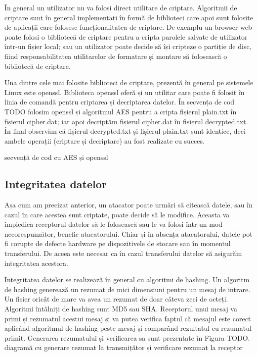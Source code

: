 În general un utilizator nu va folosi direct utilitare de criptare. Algoritmii de criptare sunt în general implementați în formă de biblioteci care apoi sunt folosite de aplicații care folosesc funcționalitatea de criptare. De exemplu un browser web poate folosi o bibliotecă de criptare pentru a cripta parolele salvate de utilizator într-un fișier local; sau un utilizator poate decide să își cripteze o partiție de disc, fiind responsabilitatea utilitarelor de formatare și montare să folosească o bibliotecă de criptare.

Una dintre cele mai folosite biblioteci de criptare, prezentă în general pe sistemele Linux este openssl. Biblioteca openssl oferă și un utilitar care poate fi folosit în linia de comandă pentru criptarea și decriptarea datelor. În secvența de cod TODO folosim openssl și algoritmul AES pentru a cripta fișierul plain.txt în fișierul cipher.dat; iar apoi decriptăm fișierul cipher.dat în fișierul decrypted.txt. În final observăm că fișierul decrypted.txt și fișierul plain.txt sunt identice, deci ambele operații (criptare și decriptare) au fost realizate cu succes.

secvență de cod cu AES și openssl

\subsection{Integritatea datelor}
\label{sec:sec:integrity}

Așa cum am precizat anterior, un atacator poate urmări să citească datele, sau în cazul în care acestea sunt criptate, poate decide să le modifice. Aceasta va împiedica receptorul datelor să le folosească sau le va folosi într-un mod necorespunzător, benefic atacatorului. Chiar și în absența atacatorului, datele pot fi corupte de defecte hardware pe dispozitivele de stocare sau în momentul transferului. De aceea este necesar ca în cazul transferului datelor să asigurăm integritatea acestora.

Integritatea datelor se realizează în general cu algoritmi de hashing. Un algoritm de hashing generează un rezumat de mici dimensiuni pentru un mesaj de intrare. Un fișier oricât de mare va avea un rezumat de doar câteva zeci de octeți. Algoritmi întâlniți de hashing sunt MD5 sau SHA. Receptorul unui mesaj va primi și rezumatul acestui mesaj și va putea verifica faptul că mesajul este corect aplicând algoritmul de hashing peste mesaj și comparând rezultatul cu rezumatul primit. Generarea rezumatului și verificarea sa sunt prezentate în Figura TODO.
diagramă cu generare rezumat la transmițător și verificare rezumat la receptor

